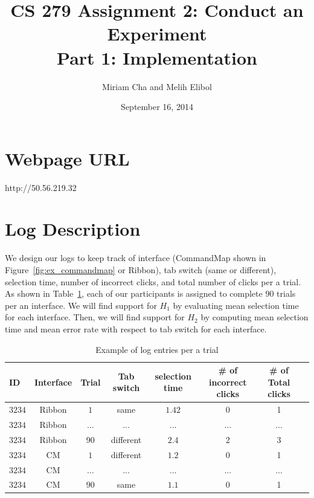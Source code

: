 \documentclass{article}
\title{CS 279 Assignment 2: Conduct an Experiment\\Part 1: Implementation}
\author{Miriam Cha and Melih Elibol}
\date{September 16, 2014}
\begin{document}
\maketitle

\section*{Webpage URL}
http://50.56.219.32
\section*{Log Description} 
 We design our logs to keep track of interface (CommandMap shown in Figure~\ref{fig:ex_commandmap} or Ribbon), tab switch (same or different),  selection time, number of incorrect clicks, and total number of clicks per a trial. As shown in Table~\ref{fig:trial_log}, each of our participants is assigned to complete $90$ trials per an interface. We will find support for $H_1$ by evaluating mean selection time for each interface. Then, we will find support for $H_2$ by computing mean selection time and mean error rate with respect to tab switch for each interface.  
 \begin{table}[tbh]
  \centering
\begin{tabular}{|l|c|c|c|c|c|c|c|}
  \hline
 ID &  Interface  &  Trial &  Tab switch & selection time & \# of incorrect clicks & \# of Total clicks              \\\hline
 $3234$ &   Ribbon  & $1$  & same  & $1.42$ & 0  &1 \\ \hline
$3234$  &    Ribbon &   $...$ & ...  & ... &  ... & ...\\\hline       
$3234$  &    Ribbon &   $90$ & different  & $2.4$ &2  &3 \\\hline      
$3234$  &    CM &   $1$ & different  & $1.2$ & 0 & 1 \\\hline   
$3234$  &    CM &   $...$ & ...  & ... &  ... & ...\\\hline   
$3234$  &    CM &   $90$ & same  & $1.1$ & 0 & 1 \\\hline  
\end{tabular}
\caption{Example of log entries per a trial}
\label{fig:trial_log}
\end{table}
\end{document}

